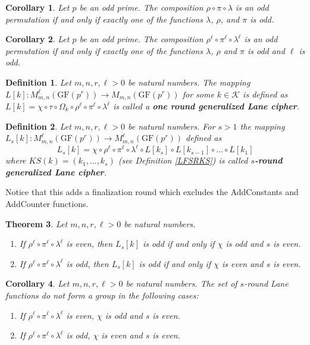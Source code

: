 \documentclass[11pt]{amsart}
\newcommand{\KK}{\mathcal{K}}
\newcommand{\GF}{\mathrm{GF}}
\newtheorem{definition}{{\bf Definition}}
\newtheorem{theorem}{{\bf Theorem }}
\newtheorem{corollary}[theorem]{{\bf Corollary}}
\begin{document}
\begin{corollary}
Let $p$ be an odd prime. The composition $\rho \circ \pi \circ \lambda$ is an odd permutation if and only if exactly one of  the functions  $\lambda$, $\rho$, and $\pi$ is odd.
\end{corollary}

\begin{corollary}
Let $p$ be an odd prime. The composition $\rho^\ell \circ \pi^\ell \circ \lambda^\ell$ is an odd permutation if and only if exactly one of the functions $\lambda$, $\rho$ and $\pi$ is odd and $\ell$ is odd.
\end{corollary}


\begin{definition}
Let $m,n,r,\ell>0$ be natural numbers. The mapping $L[k]: M^\ell_{m,n}(\GF(p^r))\rightarrow M_{m,n}(\GF(p^r))$ for some $k \in \KK$ is defined as $L[k]=\chi \circ \tau \circ \Omega_k \circ \rho^\ell \circ \pi^\ell \circ \lambda^\ell$ is called a {\bf one round generalized Lane cipher}.
\end{definition}


\begin{definition}
Let $m, n, r, \ell >0$ be natural numbers.  For $s>1$ the  mapping $L_s[k]: M^\ell_{m,n}(\GF(p^r))\rightarrow M^\ell_{m,n}(\GF(p^r))$ defined as
\[
L_s[k] = \chi \circ \rho^\ell \circ \pi^\ell \circ \lambda^\ell \circ L[k_{s}] \circ L[k_{s-1}] \circ \dots \circ L[k_1]
\]
where $KS(k) = (k_1, \dots, k_{s})$ (see Definition \ref{LFSRKS}) is called {\bf $s$-round generalized Lane cipher}.
\end{definition}
Notice that this adds a finalization round which excludes the AddConstants and AddCounter functions.

\begin{theorem}
Let $m, n, r, \ell >0$ be natural numbers.
\begin{enumerate}
\item If $\rho^\ell \circ \pi^\ell \circ \lambda^\ell$ is even, then $L_s[k]$ is odd if and only if $\chi$ is odd and $s$ is even.
\item If $\rho^\ell \circ \pi^\ell \circ \lambda^\ell$ is odd, then $L_s[k]$ is odd if and only if $\chi$ is even and $s$ is even.
\end{enumerate}
\end{theorem}

\begin{corollary}
Let $m, n, r, \ell >0$ be natural numbers. The set of $s$-round Lane functions do not form a group in the following cases:
\begin{enumerate}
\item If $\rho^\ell \circ \pi^\ell \circ \lambda^\ell$ is even, $\chi$ is odd and $s$ is even.
\item If $\rho^\ell \circ \pi^\ell \circ \lambda^\ell$ is odd, $\chi$ is even and $s$ is even.
\end{enumerate}
\end{corollary}
\end{document}
